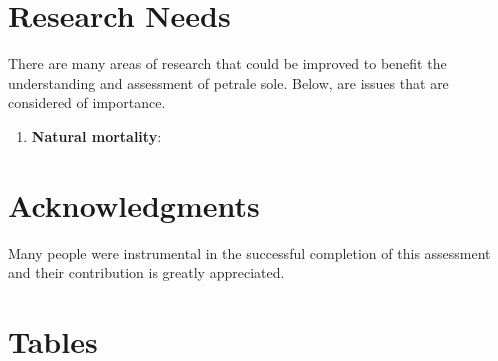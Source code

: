 \documentclass[12pt,]{article}
\begin{document}
\section{Research Needs}\label{research-needs}

There are many areas of research that could be improved to benefit the
understanding and assessment of petrale sole. Below, are issues that are
considered of importance.

\begin{enumerate}

\item \textbf{Natural mortality}: 



\end{enumerate}

\section{Acknowledgments}\label{acknowledgments}

Many people were instrumental in the successful completion of this
assessment and their contribution is greatly appreciated.

\newpage

\FloatBarrier

\section{Tables}\label{tables}
\end{document}
